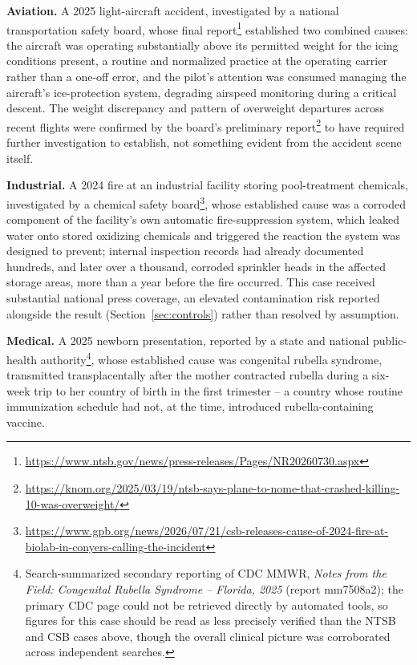 \documentclass[11pt]{article}
\begin{document}
\textbf{Aviation.} A 2025 light-aircraft accident, investigated by a
national transportation safety board, whose final
report\footnote{\url{https://www.ntsb.gov/news/press-releases/Pages/NR20260730.aspx}}
established two combined causes: the aircraft was operating substantially
above its permitted weight for the icing conditions present, a routine
and normalized practice at the operating carrier rather than a one-off
error, and the pilot's attention was consumed managing the aircraft's
ice-protection system, degrading airspeed monitoring during a critical
descent. The weight discrepancy and pattern of overweight departures
across recent flights were confirmed by the board's preliminary
report\footnote{\url{https://knom.org/2025/03/19/ntsb-says-plane-to-nome-that-crashed-killing-10-was-overweight/}}
to have required further investigation to establish, not something evident
from the accident scene itself.

\textbf{Industrial.} A 2024 fire at an industrial facility storing
pool-treatment chemicals, investigated by a chemical safety
board\footnote{\url{https://www.gpb.org/news/2026/07/21/csb-releases-cause-of-2024-fire-at-biolab-in-conyers-calling-the-incident}},
whose established cause was a corroded component of the facility's own
automatic fire-suppression system, which leaked water onto stored
oxidizing chemicals and triggered the reaction the system was designed to
prevent; internal inspection records had already documented hundreds, and
later over a thousand, corroded sprinkler heads in the affected storage
areas, more than a year before the fire occurred. This case received
substantial national press coverage, an elevated contamination risk
reported alongside the result (Section~\ref{sec:controls}) rather than
resolved by assumption.

\textbf{Medical.} A 2025 newborn presentation, reported by a state and
national public-health authority\footnote{Search-summarized secondary
reporting of CDC MMWR, \emph{Notes from the Field: Congenital Rubella
Syndrome -- Florida, 2025} (report mm7508a2); the primary CDC page could
not be retrieved directly by automated tools, so figures for this case
should be read as less precisely verified than the NTSB and CSB cases
above, though the overall clinical picture was corroborated across
independent searches.}, whose established cause was congenital rubella
syndrome, transmitted transplacentally after the mother contracted rubella
during a six-week trip to her country of birth in the first trimester --
a country whose routine immunization schedule had not, at the time,
introduced rubella-containing vaccine.
\end{document}
